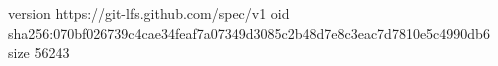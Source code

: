 version https://git-lfs.github.com/spec/v1
oid sha256:070bf026739c4cae34feaf7a07349d3085c2b48d7e8c3eac7d7810e5c4990db6
size 56243
